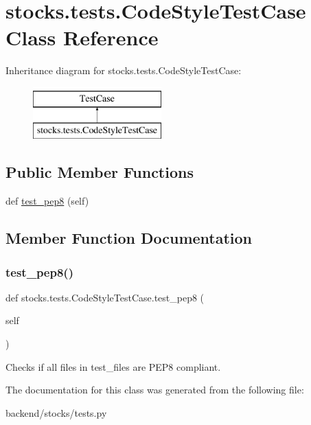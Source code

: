 \hypertarget{classstocks_1_1tests_1_1_code_style_test_case}{}\section{stocks.\+tests.\+Code\+Style\+Test\+Case Class Reference}
\label{classstocks_1_1tests_1_1_code_style_test_case}
Inheritance diagram for stocks.\+tests.\+Code\+Style\+Test\+Case\+:\begin{figure}[H]
\begin{center}
\leavevmode
\includegraphics[height=2.000000cm]{classstocks_1_1tests_1_1_code_style_test_case}
\end{center}
\end{figure}
\subsection*{Public Member Functions}
\begin{DoxyCompactItemize}
\item 
def \mbox{\hyperlink{classstocks_1_1tests_1_1_code_style_test_case_a132cc200ec770fe6a050aadcce5032b2}{test\+\_\+pep8}} (self)
\end{DoxyCompactItemize}


\subsection{Member Function Documentation}
\mbox{\label{classstocks_1_1tests_1_1_code_style_test_case_a132cc200ec770fe6a050aadcce5032b2}} 
\subsubsection{\texorpdfstring{test\+\_\+pep8()}{test\_pep8()}}
{\footnotesize\ttfamily def stocks.\+tests.\+Code\+Style\+Test\+Case.\+test\+\_\+pep8 (\begin{DoxyParamCaption}\item[{}]{self }\end{DoxyParamCaption})}

\begin{DoxyVerb}Checks if all files in test_files are PEP8 compliant.
\end{DoxyVerb}
 

The documentation for this class was generated from the following file\+:\begin{DoxyCompactItemize}
\item 
backend/stocks/tests.\+py\end{DoxyCompactItemize}
